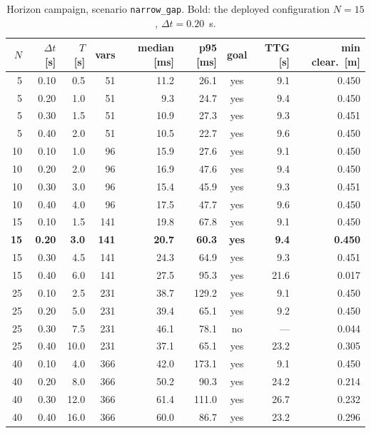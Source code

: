 \begin{table}[htbp]
  \centering
  \small
  \caption{Horizon campaign, scenario \texttt{narrow\_gap}. Bold: the deployed configuration $N=15$, $\Delta t=0.20$~s.}
  \label{res:tab:horizon:narrowgap}
  \begin{tabular}{rrrrrrcrr}
    \toprule
    $N$ & $\Delta t$ [s] & $T$ [s] & vars & median [ms] & p95 [ms] & goal & TTG [s] & min clear.\ [m] \\
    \midrule
    5 & 0.10 & 0.5 & 51 & 11.2 & 26.1 & yes & 9.1 & 0.450 \\
    5 & 0.20 & 1.0 & 51 & 9.3 & 24.7 & yes & 9.4 & 0.450 \\
    5 & 0.30 & 1.5 & 51 & 10.9 & 27.3 & yes & 9.3 & 0.451 \\
    5 & 0.40 & 2.0 & 51 & 10.5 & 22.7 & yes & 9.6 & 0.450 \\
    10 & 0.10 & 1.0 & 96 & 15.9 & 27.6 & yes & 9.1 & 0.450 \\
    10 & 0.20 & 2.0 & 96 & 16.9 & 47.6 & yes & 9.4 & 0.450 \\
    10 & 0.30 & 3.0 & 96 & 15.4 & 45.9 & yes & 9.3 & 0.451 \\
    10 & 0.40 & 4.0 & 96 & 17.5 & 47.7 & yes & 9.6 & 0.450 \\
    15 & 0.10 & 1.5 & 141 & 19.8 & 67.8 & yes & 9.1 & 0.450 \\
    \textbf{15} & \textbf{0.20} & \textbf{3.0} & \textbf{141} & \textbf{20.7} & \textbf{60.3} & \textbf{yes} & \textbf{9.4} & \textbf{0.450} \\
    15 & 0.30 & 4.5 & 141 & 24.3 & 64.9 & yes & 9.3 & 0.451 \\
    15 & 0.40 & 6.0 & 141 & 27.5 & 95.3 & yes & 21.6 & 0.017 \\
    25 & 0.10 & 2.5 & 231 & 38.7 & 129.2 & yes & 9.1 & 0.450 \\
    25 & 0.20 & 5.0 & 231 & 39.4 & 65.1 & yes & 9.2 & 0.450 \\
    25 & 0.30 & 7.5 & 231 & 46.1 & 78.1 & no & --- & 0.044 \\
    25 & 0.40 & 10.0 & 231 & 37.1 & 65.1 & yes & 23.2 & 0.305 \\
    40 & 0.10 & 4.0 & 366 & 42.0 & 173.1 & yes & 9.1 & 0.450 \\
    40 & 0.20 & 8.0 & 366 & 50.2 & 90.3 & yes & 24.2 & 0.214 \\
    40 & 0.30 & 12.0 & 366 & 61.4 & 111.0 & yes & 26.7 & 0.232 \\
    40 & 0.40 & 16.0 & 366 & 60.0 & 86.7 & yes & 23.2 & 0.296 \\
    \bottomrule
  \end{tabular}
\end{table}


